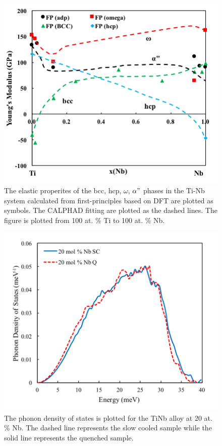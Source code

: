 \pagebreak
\begin{figure}[H]
	\centering
	\includegraphics[width=\textwidth]{Chapter-7/Figures/tinbelastic.png}
	\caption{The elastic properites of the bcc, hcp, $\omega$, $\alpha"$ phases in the Ti-Nb system calculated from first-principles based on DFT are plotted as symbols. The CALPHAD fitting are plotted as the dashed lines. The figure is plotted from 100 at. \% Ti to 100 at. \% Nb.}
	\label{Ch7-figure:tinbelastic}
\end{figure}

\pagebreak
\begin{figure}[H]
	\centering
	\includegraphics[width=\textwidth]{Chapter-7/Figures/50dos_20.png}
	\caption{The phonon density of states is plotted for the TiNb alloy at 20 at. \% Nb. The dashed line represents the slow cooled sample while the solid line represents the quenched sample.}
	\label{Ch7-figure:50dos_20}
\end{figure}

